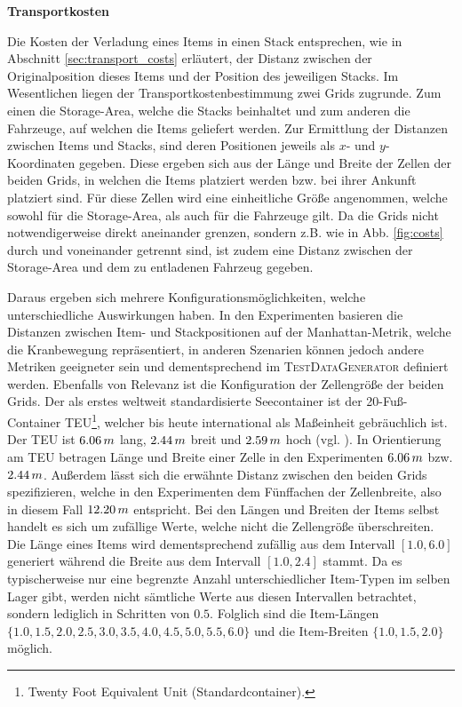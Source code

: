 \textbf{Transportkosten}

Die Kosten der Verladung eines Items in einen Stack entsprechen, wie in Abschnitt
\ref{sec:transport_costs} erläutert, der Distanz zwischen der Originalposition dieses Items und der Position
des jeweiligen Stacks. Im Wesentlichen liegen der Transportkostenbestimmung zwei Grids zugrunde. Zum einen die Storage-Area,
welche die Stacks beinhaltet und zum anderen die Fahrzeuge, auf welchen die Items geliefert werden.
Zur Ermittlung der Distanzen zwischen Items und Stacks, sind deren Positionen jeweils als $x$- und $y$-Koordinaten gegeben.
Diese ergeben sich aus der Länge und Breite der Zellen der beiden Grids, in welchen die Items platziert werden
bzw. bei ihrer Ankunft platziert sind. Für diese Zellen wird eine einheitliche Größe angenommen,
welche sowohl für die Storage-Area, als auch für die Fahrzeuge gilt.
Da die Grids nicht notwendigerweise direkt aneinander grenzen, sondern z.B. wie in Abb. \ref{fig:costs}
durch  und  voneinander getrennt sind, ist zudem eine Distanz
zwischen der Storage-Area und dem zu entladenen Fahrzeug gegeben.

Daraus ergeben sich mehrere Konfigurationsmöglichkeiten, welche unterschiedliche Auswirkungen haben.
In den Experimenten basieren die Distanzen zwischen Item- und Stackpositionen auf der Manhattan-Metrik,
welche die Kranbewegung repräsentiert, in anderen Szenarien können jedoch andere Metriken geeigneter sein
und dementsprechend im \textsc{TestDataGenerator} definiert werden.
Ebenfalls von Relevanz ist die Konfiguration der Zellengröße der beiden Grids. Der als erstes weltweit standardisierte
Seecontainer ist der 20-Fuß-Container TEU\footnote{Twenty Foot Equivalent Unit (Standardcontainer).},
welcher bis heute international als Maßeinheit gebräuchlich ist. Der TEU ist $6.06 \thinspace m$ lang,
$2.44 \thinspace m$ breit und $2.59 \thinspace m$ hoch (vgl. \citet{ContainerBasis}).
In Orientierung am TEU betragen Länge und Breite einer Zelle in den Experimenten $6.06 \thinspace m$ bzw.
$2.44 \thinspace m$. Außerdem lässt sich die erwähnte Distanz zwischen den beiden Grids spezifizieren,
welche in den Experimenten dem Fünffachen der Zellenbreite, also in diesem Fall $12.20 \thinspace m$ entspricht.
Bei den Längen und Breiten der Items selbst handelt es sich um zufällige Werte, welche nicht die Zellengröße überschreiten.
Die Länge eines Items wird dementsprechend zufällig aus dem Intervall $[1.0, 6.0]$ generiert während die Breite aus dem
Intervall $[1.0, 2.4]$ stammt. Da es typischerweise nur eine begrenzte Anzahl unterschiedlicher Item-Typen im selben Lager
gibt, werden nicht sämtliche Werte aus diesen Intervallen betrachtet, sondern lediglich in Schritten von $0.5$.
Folglich sind die Item-Längen $\{1.0, 1.5, 2.0, 2.5, 3.0, 3.5, 4.0, 4.5, 5.0, 5.5, 6.0\}$ und
die Item-Breiten $\{1.0, 1.5, 2.0\}$ möglich.

